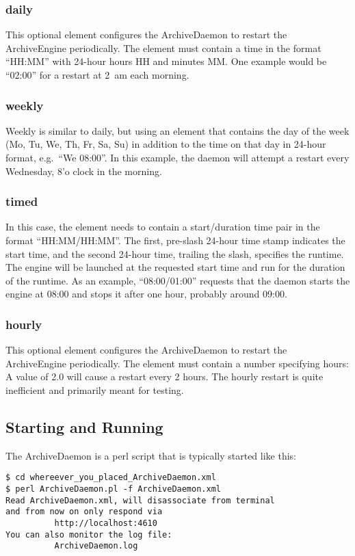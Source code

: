 \subsubsection{daily}
This optional element configures the ArchiveDaemon to restart the
ArchiveEngine periodically. The element must contain a time in the
format ``HH:MM'' with 24-hour hours HH and minutes MM. One example
would be ``02:00'' for a restart at 2~am each morning.

\subsubsection{weekly}
Weekly is similar to daily, but using an element that contains the day
of the week (Mo, Tu,  We, Th, Fr, Sa, Su) in addition to the time
on that day in 24-hour format, e.g.\ ``We 08:00''. In this example,
the daemon will attempt a restart every Wednesday, 8'o clock in the morning.

\subsubsection{timed}
In this case, the element needs to contain a start/duration time pair
in the format ``HH:MM/HH:MM''. The first, pre-slash 24-hour time stamp
indicates the start time, and the second 24-hour time, trailing the
slash, specifies the runtime. The engine will be launched at the
requested start time and run for the duration of the runtime. As an
example, ``08:00/01:00'' requests that the daemon starts the engine at
08:00 and stops it after one hour, probably around 09:00.

\subsubsection{hourly}
This optional element configures the ArchiveDaemon to restart the
ArchiveEngine periodically. The element must contain a number
specifying hours: A value of 2.0 will cause a restart every 2
hours. The hourly restart is quite inefficient and primarily meant for testing.

\subsection{Starting and Running}
The ArchiveDaemon is a perl script that is typically started like this:

\begin{lstlisting}[keywordstyle=\sffamily]
$ cd whereever_you_placed_ArchiveDaemon.xml
$ perl ArchiveDaemon.pl -f ArchiveDaemon.xml
Read ArchiveDaemon.xml, will disassociate from terminal
and from now on only respond via
          http://localhost:4610
You can also monitor the log file:
          ArchiveDaemon.log
\end{lstlisting}

